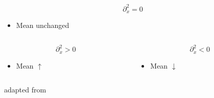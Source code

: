 \documentclass[
 ]{beamer}%
\begin{document}
\begin{frame}
\begin{columns}
\begin{column}{0.4\textwidth}
            \vspace{0.2cm}
            \begin{equation*}
                \partial_x^2=0
            \end{equation*}
            \begin{itemize}
                \vspace{-0.65cm}
                \centering
                \item Mean unchanged
            \end{itemize}
            \vspace{-0.3cm}
            \begin{columns}
                \begin{column}{0.4\textwidth}
                    \begin{equation*}
                        \partial_x^2>0
                    \end{equation*}
                    \begin{itemize}
                        \vspace{-0.65cm}
                        \centering
                        \item Mean $\uparrow$
                    \end{itemize}
                \end{column}
                \begin{column}{0.4\textwidth}
                    \begin{equation*}
                        \partial_x^2<0
                    \end{equation*}
                    \begin{itemize}
                        \vspace{-0.65cm}
                        \centering
                        \item Mean $\downarrow$
                    \end{itemize}
                \end{column}
            \end{columns}
            \vspace{1cm}
            \raggedleft
            \scriptsize adapted from \cite{Morgan2019}
        \end{column}
    \end{columns}
\end{frame}


    
\end{document}
